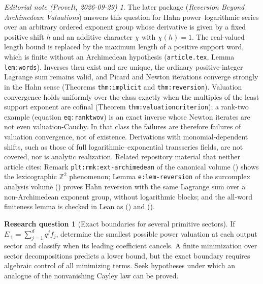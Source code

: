 \documentclass[11pt,a4paper]{article}
\theoremstyle{definition}
\newtheorem{question}[theorem]{Research question}
\theoremstyle{remark}
\newtheorem*{ednote}{Editorial note (ProveIt, 2026-09-29)}
\newcommand{\Z}{\mathbb Z}
\begin{document}
\begin{ednote}\label{ed:beyond-archimedean}
The later package
(\textit{Reversion Beyond Archimedean Valuations}) answers this question
for Hahn power--logarithmic series over an arbitrary ordered exponent group
whose derivative is given by a fixed positive shift $h$ and an additive
character $\chi$ with $\chi(h)=1$. The real-valued length bound is replaced
by the maximum length of a positive support word, which is finite without
an Archimedean hypothesis (\texttt{article.tex}, Lemma
\texttt{lem:words}). Inverses then exist and are unique, the ordinary
positive-integer Lagrange sum remains valid, and Picard and Newton
iterations converge strongly in the Hahn sense (Theorems
\texttt{thm:implicit} and \texttt{thm:reversion}). Valuation convergence
holds uniformly over the class exactly when the multiples of the least
support exponent are cofinal (Theorem \texttt{thm:valuationcriterion});
a rank-two example (equation \texttt{eq:ranktwov}) is an exact inverse
whose Newton iterates are not even valuation-Cauchy. In that class the
failures are therefore failures of valuation convergence, not of
existence. Derivations with monomial-dependent shifts, such as those of
full logarithmic--exponential transseries fields, are not covered, nor is
analytic realization. Related repository material that neither article
cites: Remark \texttt{plt:rmk:ext-archimedean} of the canonical volume
()
shows the lexicographic $\Z^2$ phenomenon; Lemma \texttt{e:lem-reversion}
of the surcomplex analysis volume
()
proves Hahn reversion with the same Lagrange sum over a non-Archimedean
exponent group, without logarithmic blocks; and the all-word finiteness
lemma is checked in Lean as
() and
().
\end{ednote}

\begin{question}[Exact boundaries for several primitive sectors]
If $E_+=\sum_{j=1}^{d}q^j f_j$, determine the smallest possible power
valuation at each output sector and classify when its leading coefficient
cancels. A finite minimization over sector decompositions predicts a lower
bound, but the exact boundary requires algebraic control of all minimizing
terms. Seek hypotheses under which an analogue of the nonvanishing Cayley
law can be proved.
\end{question}
\end{document}
